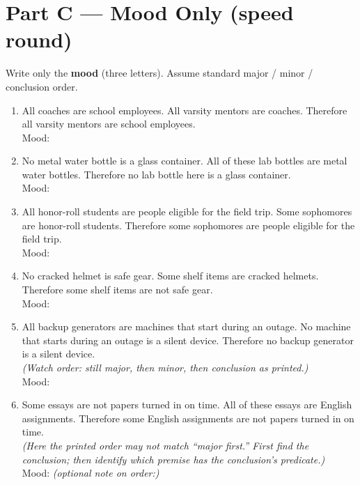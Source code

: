 \documentclass[11pt]{article}
\begin{document}
\section*{Part C --- Mood Only (speed round)}
\noindent Write only the \textbf{mood} (three letters). Assume standard major / minor / conclusion order.

\begin{enumerate}
\item All coaches are school employees. All varsity mentors are coaches. Therefore all varsity mentors are school employees.\\
Mood: \underline{\hspace{1.0in}}

\item No metal water bottle is a glass container. All of these lab bottles are metal water bottles. Therefore no lab bottle here is a glass container.\\
Mood: \underline{\hspace{1.0in}}

\item All honor-roll students are people eligible for the field trip. Some sophomores are honor-roll students. Therefore some sophomores are people eligible for the field trip.\\
Mood: \underline{\hspace{1.0in}}

\item No cracked helmet is safe gear. Some shelf items are cracked helmets. Therefore some shelf items are not safe gear.\\
Mood: \underline{\hspace{1.0in}}

\item All backup generators are machines that start during an outage. No machine that starts during an outage is a silent device. Therefore no backup generator is a silent device.\\
\textit{(Watch order: still major, then minor, then conclusion as printed.)}\\
Mood: \underline{\hspace{1.0in}}

\item Some essays are not papers turned in on time. All of these essays are English assignments. Therefore some English assignments are not papers turned in on time.\\
\textit{(Here the printed order may not match ``major first.'' First find the conclusion; then identify which premise has the conclusion's predicate.)}\\
Mood: \underline{\hspace{1.0in}} \quad
\textit{(optional note on order:)} \underline{\hspace{2.4in}}


\end{enumerate}
\end{document}
